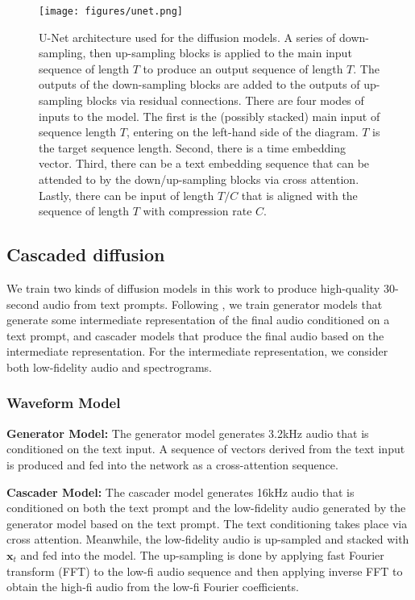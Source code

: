 \begin{figure*}[ht]
\vskip 0.05in
\begin{center}
\centerline{\texttt{[image: figures/unet.png]}}
\vskip -0.05in
\caption{U-Net architecture used for the diffusion models. A series of down-sampling, then up-sampling blocks is applied to the main input sequence of length $T$ to produce an output sequence of length $T$. The outputs of the down-sampling blocks are added to the outputs of up-sampling blocks via residual connections. There are four modes of inputs to the model. The first is the (possibly stacked) main input of sequence length $T$, entering on the left-hand side of the diagram. $T$ is the target sequence length. Second, there is a time embedding vector. Third, there can be a text embedding sequence that can be attended to by the down/up-sampling blocks via cross attention. Lastly, there can be input of length $T/C$ that is aligned with the sequence of length $T$ with compression rate $C$.}
\label{U-Net}
\end{center}
\vskip -0.25in
\end{figure*}

\subsection{Cascaded diffusion}

We train two kinds of diffusion models in this work to produce high-quality 30-second audio from text prompts. Following \cite{ho2022cascaded}, we train generator models that generate some intermediate representation of the final audio conditioned on a text prompt, and cascader models that produce the final audio based on the intermediate representation. For the intermediate representation, we consider both low-fidelity audio and spectrograms.

\subsubsection{Waveform Model}

\textbf{Generator Model:} The generator model generates 3.2kHz audio that is conditioned on the text input. A sequence of vectors derived from the text input is produced and fed into the network as a cross-attention sequence.

\textbf{Cascader Model:} The cascader model generates 16kHz audio that is conditioned on both the text prompt and the low-fidelity audio generated by the generator model based on the text prompt. The text conditioning takes place via cross attention. Meanwhile, the low-fidelity audio is up-sampled and stacked with $\mathbf{x}_t$ and fed into the model. The up-sampling is done by applying fast Fourier transform (FFT) to the low-fi audio sequence and then applying inverse FFT to obtain the high-fi audio from the low-fi Fourier coefficients.

